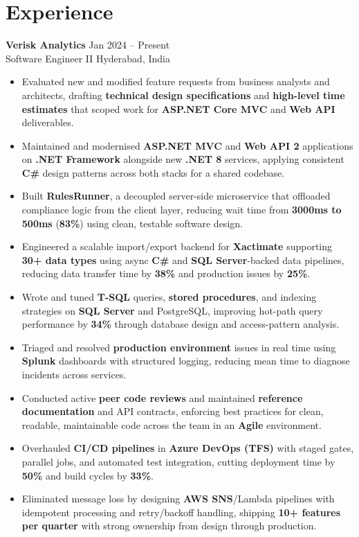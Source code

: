 \documentclass[10pt,letterpaper]{article}
\newcommand{\resumeSubheading}[4]{%
  \textbf{#1} \hfill #2 \\
  #3 \hfill #4 \\
}
\begin{document}
\section*{Experience}
\resumeSubheading{Verisk Analytics}{Jan 2024 -- Present}{Software Engineer II}{Hyderabad, India}
\begin{itemize}
    \item Evaluated new and modified feature requests from business analysts and architects, drafting \textbf{technical design specifications} and \textbf{high-level time estimates} that scoped work for \textbf{ASP.NET Core MVC} and \textbf{Web API} deliverables.
    \item Maintained and modernised \textbf{ASP.NET MVC} and \textbf{Web API 2} applications on \textbf{.NET Framework} alongside new \textbf{.NET 8} services, applying consistent \textbf{C\#} design patterns across both stacks for a shared codebase.
    \item Built \textbf{RulesRunner}, a decoupled server-side microservice that offloaded compliance logic from the client layer, reducing wait time from \textbf{3000ms to 500ms} (\textbf{83\%}) using clean, testable software design.
    \item Engineered a scalable import/export backend for \textbf{Xactimate} supporting \textbf{30+ data types} using async \textbf{C\#} and \textbf{SQL Server}-backed data pipelines, reducing data transfer time by \textbf{38\%} and production issues by \textbf{25\%}.
    \item Wrote and tuned \textbf{T-SQL} queries, \textbf{stored procedures}, and indexing strategies on \textbf{SQL Server} and PostgreSQL, improving hot-path query performance by \textbf{34\%} through database design and access-pattern analysis.
    \item Triaged and resolved \textbf{production environment} issues in real time using \textbf{Splunk} dashboards with structured logging, reducing mean time to diagnose incidents across services.
    \item Conducted active \textbf{peer code reviews} and maintained \textbf{reference documentation} and API contracts, enforcing best practices for clean, readable, maintainable code across the team in an \textbf{Agile} environment.
    \item Overhauled \textbf{CI/CD pipelines} in \textbf{Azure DevOps (TFS)} with staged gates, parallel jobs, and automated test integration, cutting deployment time by \textbf{50\%} and build cycles by \textbf{33\%}.
    \item Eliminated message loss by designing \textbf{AWS SNS}/Lambda pipelines with idempotent processing and retry/backoff handling, shipping \textbf{10+ features per quarter} with strong ownership from design through production.
\end{itemize}
\end{document}
